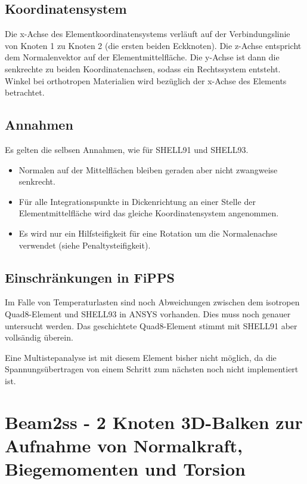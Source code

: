 \documentclass[11pt,titlepage,listof=totoc,bibliography=totoc,twoside]{scrreprt}
\begin{document}
\subsection{Koordinatensystem}

Die x-Achse des Elementkoordinatensystems verläuft auf der Verbindungslinie von Knoten 1 zu Knoten 2 (die ersten beiden Eckknoten). Die z-Achse entspricht dem Normalenvektor auf der Elementmittelfläche. Die y-Achse ist dann die senkrechte zu beiden Koordinatenachsen, sodass ein Rechtssystem entsteht. Winkel bei orthotropen Materialien wird bezüglich der x-Achse des Elements betrachtet.

\subsection{Annahmen}

Es gelten die selbsen Annahmen, wie für SHELL91 und SHELL93.

\begin{itemize}
 \item Normalen auf der Mittelflächen bleiben geraden aber nicht zwangweise senkrecht.
 \item Für alle Integrationspunkte in Dickenrichtung an einer Stelle der Elementmittelfläche wird das gleiche Koordinatensystem angenommen.
 \item Es wird nur ein Hilfsteifigkeit für eine Rotation um die Normalenachse verwendet (siehe Penaltysteifigkeit).
\end{itemize}

\subsection{Einschränkungen in FiPPS}

Im Falle von Temperaturlasten sind noch Abweichungen zwischen dem isotropen Quad8-Element und SHELL93 in ANSYS vorhanden. Dies muss noch genauer untersucht werden. Das geschichtete Quad8-Element stimmt mit SHELL91 aber vollsändig überein.

Eine Multistepanalyse ist mit diesem Element bisher nicht möglich, da die Spannungsübertragen von einem Schritt zum nächsten noch nicht implementiert ist.

\section{Beam2ss - 2 Knoten 3D-Balken zur Aufnahme von Normalkraft, Biegemomenten und Torsion}
\end{document}

